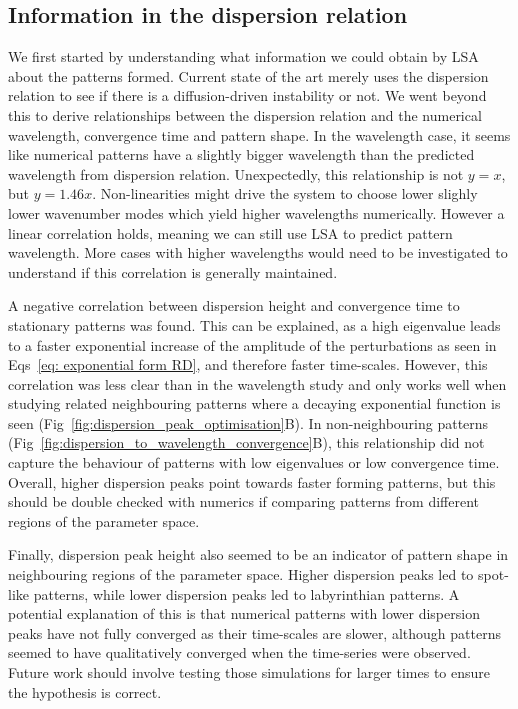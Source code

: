 \subsection*{Information in the dispersion relation}
We first started by understanding what information we could obtain by LSA about the patterns formed.
Current state of the art merely uses the dispersion relation to see if there is a diffusion-driven instability or not.
We went beyond this to derive relationships between the dispersion relation and the numerical wavelength, convergence time and pattern shape.
In the wavelength case, it seems like numerical patterns have a slightly bigger wavelength than the predicted wavelength from dispersion relation.
Unexpectedly, this relationship is not $y=x$, but $y=1.46x$.
Non-linearities might drive the system to choose lower slighly lower wavenumber modes which yield higher wavelengths numerically.
However a linear correlation holds, meaning we can still use LSA to predict pattern wavelength.
More cases with higher wavelengths would need to be investigated to understand if this correlation is generally maintained.

A negative correlation between dispersion height and convergence time to stationary patterns was found.
This can be explained, as a high eigenvalue leads to a faster exponential increase of the amplitude of the perturbations as seen in Eqs~\ref{eq: exponential form RD}, and therefore faster time-scales.
However, this correlation was less clear than in the wavelength study and only works well when studying related neighbouring patterns where a decaying exponential function is seen (Fig~\ref{fig:dispersion_peak_optimisation}B).
In non-neighbouring patterns (Fig~\ref{fig:dispersion_to_wavelength_convergence}B), this relationship did not capture the behaviour of patterns with low eigenvalues or low convergence time.
Overall, higher dispersion peaks point towards faster forming patterns, but this should be double checked with numerics if comparing patterns from different regions of the parameter space.

Finally, dispersion peak height also seemed to be an indicator of pattern shape in neighbouring regions of the parameter space.
Higher dispersion peaks led to spot-like patterns, while lower dispersion peaks led to labyrinthian patterns.
A potential explanation of this is that numerical patterns with lower dispersion peaks have not fully converged as their time-scales are slower, although patterns seemed to have qualitatively converged when the time-series were observed.
Future work should involve testing those simulations for larger times to ensure the hypothesis is correct.


